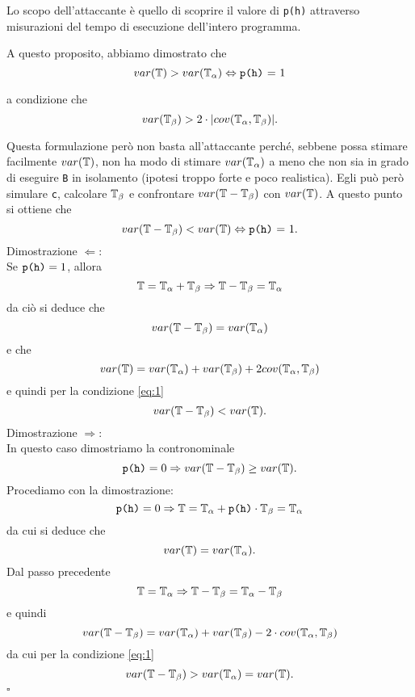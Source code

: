 	Lo scopo dell'attaccante è quello di scoprire il valore di \texttt{p(h)} attraverso misurazioni del tempo di esecuzione dell'intero programma.
	
	A questo proposito, abbiamo dimostrato che $$var(\mathbb{T}) > var(\mathbb{T}_{\alpha}) \Leftrightarrow \text{\texttt{p(h)} = 1}$$ 
	
	a condizione che 
	\begin{equation} \label{eq:1}
		var(\mathbb{T}_{\beta}) > 2 \cdot |cov(\mathbb{T}_{\alpha},\mathbb{T}_{\beta})|.
	\end{equation}
		
	Questa formulazione però non basta all'attaccante perché, sebbene possa stimare facilmente $var(\mathbb{T})$, non ha modo di stimare $var(\mathbb{T}_{\alpha})$ a meno che non sia in grado di eseguire \texttt{B} in isolamento (ipotesi troppo forte e poco realistica). Egli può però simulare \texttt{c}, calcolare $\mathbb{T}_{\beta}$ e confrontare $var(\mathbb{T} - \mathbb{T}_{\beta})$ con $var(\mathbb{T})$. A questo punto si ottiene che $$var(\mathbb{T} - \mathbb{T}_{\beta}) < var(\mathbb{T}) \Leftrightarrow \text{\texttt{p(h)} = 1}.$$ Dimostrazione $\Leftarrow$:\\
	Se $\text{\texttt{p(h)}} = 1$, allora $$\mathbb{T} = \mathbb{T}_{\alpha} + \mathbb{T}_{\beta} \Rightarrow \mathbb{T} - \mathbb{T}_{\beta} = \mathbb{T}_{\alpha}$$
	da ciò si deduce che $$var(\mathbb{T} - \mathbb{T}_{\beta}) = var(\mathbb{T}_{\alpha})$$ 
	e che $$var(\mathbb{T}) = var(\mathbb{T}_{\alpha}) + var(\mathbb{T}_{\beta}) + 2cov(\mathbb{T}_{\alpha},\mathbb{T}_{\beta})$$
	e quindi per la condizione \ref{eq:1} $$var(\mathbb{T} - \mathbb{T}_{\beta}) < var(\mathbb{T}).$$Dimostrazione $\Rightarrow$:\\
	In questo caso dimostriamo la contronominale $$\text{\texttt{p(h)}} = 0 \Rightarrow var(\mathbb{T} - \mathbb{T}_{\beta}) \geq var(\mathbb{T}).$$  
	Procediamo con la dimostrazione:
	$$\text{\texttt{p(h)}} = 0 \Rightarrow \mathbb{T} = \mathbb{T}_{\alpha} + \text{\texttt{p(h)}}\cdot \mathbb{T}_{\beta} = \mathbb{T}_{\alpha}$$
	da cui si deduce che $$var(\mathbb{T}) = var(\mathbb{T}_{\alpha}).$$
	Dal passo precedente 
	$$\mathbb{T} = \mathbb{T}_{\alpha} \Rightarrow \mathbb{T} - \mathbb{T}_{\beta} = \mathbb{T}_{\alpha} - \mathbb{T}_{\beta}$$
	e quindi
	$$var(\mathbb{T} - \mathbb{T}_{\beta}) = var(\mathbb{T}_{\alpha}) + var(\mathbb{T}_{\beta}) - 2\cdot cov (\mathbb{T}_{\alpha},\mathbb{T}_{\beta})$$
	da cui per la condizione \ref{eq:1}
	$$var(\mathbb{T} - \mathbb{T}_{\beta}) > var(\mathbb{T}_{\alpha}) = var(\mathbb{T}).$$
	$\square$